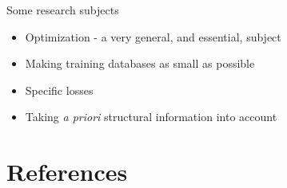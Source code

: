 \documentclass[xcolor=pdftex,dvipsnames,table,mathserif]{beamer}
\begin{document}
\begin{frame}{Some research subjects}

  \begin{itemize}
  \item Optimization - a very general, and essential, subject
  \item Making training databases as small as possible
  \item Specific losses
  \item Taking  {\it a priori} structural information into account
  \end{itemize}

\end{frame}





\section*{References}


\end{document}
